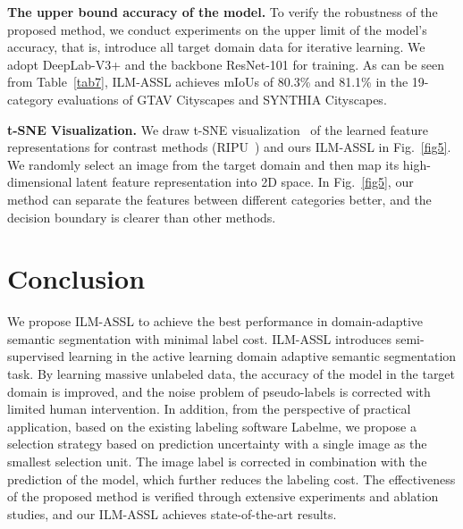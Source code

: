 \documentclass[journal]{IEEEtran}
\newcommand{\Tref}[1]{Table~\ref{#1}}
\newcommand{\fref}[1]{Fig.~\ref{#1}}
\renewcommand{\paragraph}[1]{\vspace{1.25mm}\noindent\textbf{#1}}
\newcommand{\method}{ILM-ASSL\xspace}
\begin{document}
\paragraph{The upper bound accuracy of the model.} To verify the robustness of the proposed method, we conduct experiments on the upper limit of the model’s accuracy, that is, introduce all target domain data for iterative learning. We adopt DeepLab-V3+ and the backbone ResNet-101 for training. As can be seen from \Tref{tab7}, \method achieves mIoUs of 80.3\% and 81.1\% in the 19-category evaluations of GTAV  Cityscapes and SYNTHIA  Cityscapes.

\paragraph{t-SNE Visualization.} We draw t-SNE visualization~\cite{van2008visualizing} of the learned feature representations for contrast methods (RIPU~\cite{xie2022towards}) and ours \method in \fref{fig5}. We randomly select an image from the target domain and then map its high-dimensional latent feature representation into 2D space. In \fref{fig5}, our method can separate the features between different categories better, and the decision boundary is clearer than other methods. 


\section{Conclusion}
\label{sec:conclusion}

We propose \method to achieve the best performance in domain-adaptive semantic segmentation with minimal label cost. \method introduces semi-supervised learning in the active learning domain adaptive semantic segmentation task. By learning massive unlabeled data, the accuracy of the model in the target domain is improved, and the noise problem of pseudo-labels is corrected with limited human intervention. In addition, from the perspective of practical application, based on the existing labeling software Labelme, we propose a selection strategy based on prediction uncertainty with a single image as the smallest selection unit. The image label is corrected in combination with the prediction of the model, which further reduces the labeling cost. The effectiveness of the proposed method is verified through extensive experiments and ablation studies, and our \method achieves state-of-the-art results.





\end{document}

